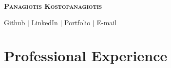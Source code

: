 \documentclass[11pt,a4paper,sans]{moderncv}        %
\begin{document}

\begin{center}
\textbf{\huge \scshape Panagiotis Kostopanagiotis} \\ \vspace{0.2pt}
\end{center}
\normalsize

\begin{center}
    \href{https://github.com/infinity4471}{\faGithub\quad}Github $|$ 
    \href{https://www.linkedin.com/in/panagiotis-kostopanagiotis/}{\faLinkedin\quad}LinkedIn $|$
    \href{https://infinity4471.github.io}{\faGlobe\quad}Portfolio $|$
    \href{mailto:panagiotis.kostopanagiotis@gmail.com}{\faEnvelope\quad}E-mail
 \end{center}
\section{Professional Experience}
\end{document}
